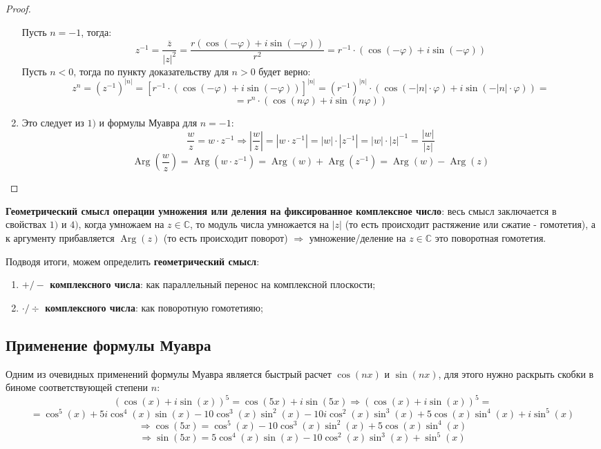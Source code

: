 \documentclass[12pt]{article}
\newcommand{\MC}{\mathbb{C}}
\theoremstyle{definition}
\newcommand{\ovl}[1]{\overline{#1}}
\DeclareMathOperator\Arg{Arg}
\begin{document}
\begin{proof}
\begin{enumerate}[label=\arabic*)]
		Пусть $n = -1$, тогда:
		$$
			z^{-1} = \dfrac{\ovl{z}}{|z|^2} = \dfrac{r(\cos(-\varphi) + i\sin(-\varphi))}{r^2} = r^{-1}{\cdot}(\cos(-\varphi) + i\sin(-\varphi))
		$$
		Пусть $n < 0$, тогда по пункту доказательству для $n>0$ будет верно:
		$$
			z^n = (z^{-1})^{|n|} = \left[r^{-1}{\cdot}(\cos(-\varphi) + i\sin(-\varphi))\right]^{|n|} = (r^{-1})^{|n|}{\cdot}(\cos(-|n|{\cdot}\varphi) + i\sin(-|n|{\cdot}\varphi)) = 
		$$
		$$
			= r^n{\cdot}(\cos(n\varphi) + i\sin(n\varphi))
		$$
		\item Это следует из $1)$ и формулы Муавра для $n=-1$:
		$$
			\dfrac{w}{z} = w{\cdot}z^{-1} \Rightarrow \left|\dfrac{w}{z}\right| = | w{\cdot}z^{-1}| = |w|{\cdot}|z^{-1}| = |w|{\cdot}|z|^{-1} = \dfrac{|w|}{|z|}
		$$
		$$
			\Arg\left(\dfrac{w}{z}\right) = \Arg\left(w{\cdot}z^{-1}\right) = \Arg(w) + \Arg(z^{-1}) = \Arg(w) - \Arg(z)
		$$
	\end{enumerate}
\end{proof}

\textbf{Геометрический смысл операции умножения или деления на фиксированное комплексное число}: весь смысл заключается в свойствах $1)$ и $4)$, когда умножаем на $z \in \MC$, то модуль числа умножается на $|z|$ (то есть происходит растяжение или сжатие - гомотетия), а к аргументу прибавляется $\Arg(z)$ (то есть происходит поворот) $\Rightarrow$ умножение/деление на $z \in \MC$ это поворотная гомотетия.

Подводя итоги, можем определить \textbf{геометрический смысл}:
\begin{enumerate}[label=\arabic*)]
	\item \textbf{$+/-$ комплексного числа}: как параллельный перенос на комплексной плоскости;
	\item \textbf{$\cdot/\div$ комплексного числа}: как поворотную гомотетияю;
\end{enumerate}

\subsection*{Применение формулы Муавра}
Одним из очевидных применений формулы Муавра является быстрый расчет $\cos(nx)$ и $\sin(nx)$, для этого нужно раскрыть скобки в биноме соответствующей степени $n$:
$$
	(\cos(x) + i\sin(x))^5 = \cos(5x) + i\sin(5x) 	\Rightarrow (\cos(x) + i\sin(x))^5 = 
$$
$$
	=\cos^5(x) + 5i\cos^4(x)\sin(x) - 10\cos^3(x)\sin^2(x) - 10i\cos^2(x)\sin^3(x) + 5\cos(x) \sin^4(x) + i\sin^5(x)
$$
$$
	 \Rightarrow \cos(5x) = \cos^5(x) - 10\cos^3(x)\sin^2(x) + 5\cos(x)\sin^4(x)
$$
$$
	\Rightarrow \sin(5x) = 5\cos^4(x)\sin(x) - 10 \cos^2(x)\sin^3(x) + \sin^5(x)
$$
\end{document}
